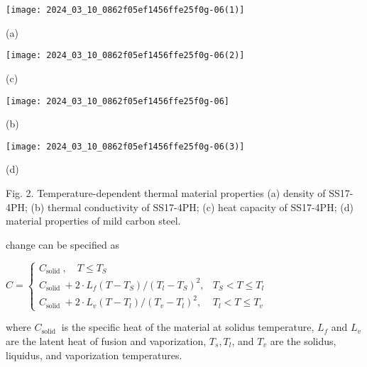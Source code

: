 \documentclass[10pt]{article}
\begin{document}
\begin{center}
\texttt{[image: 2024\_03\_10\_0862f05ef1456ffe25f0g-06(1)]}
\end{center}

(a)

\begin{center}
\texttt{[image: 2024\_03\_10\_0862f05ef1456ffe25f0g-06(2)]}
\end{center}

(c)

\begin{center}
\texttt{[image: 2024\_03\_10\_0862f05ef1456ffe25f0g-06]}
\end{center}

(b)

\begin{center}
\texttt{[image: 2024\_03\_10\_0862f05ef1456ffe25f0g-06(3)]}
\end{center}

(d)

Fig. 2. Temperature-dependent thermal material properties (a) density of SS17-4PH; (b) thermal conductivity of SS17-4PH; (c) heat capacity of SS17-4PH; (d) material properties of mild carbon steel.

change can be specified as

$C=\left\{\begin{array}{cc}C_{\text {solid }}, \quad T \leqslant T_{S} \\ C_{\text {solid }}+2 \cdot L_{f}\left(T-T_{S}\right) /\left(T_{l}-T_{S}\right)^{2}, & T_{S}<T \leqslant T_{l} \\ C_{\text {solid }}+2 \cdot L_{v}\left(T-T_{l}\right) /\left(T_{v}-T_{l}\right)^{2}, & T_{l}<T \leqslant T_{v}\end{array}\right.$

where $C_{\text {solid }}$ is the specific heat of the material at solidus temperature, $L_{f}$ and $L_{v}$ are the latent heat of fusion and vaporization, $T_{s}, T_{l}$, and $T_{v}$ are the solidus, liquidus, and vaporization temperatures.
\end{document}
